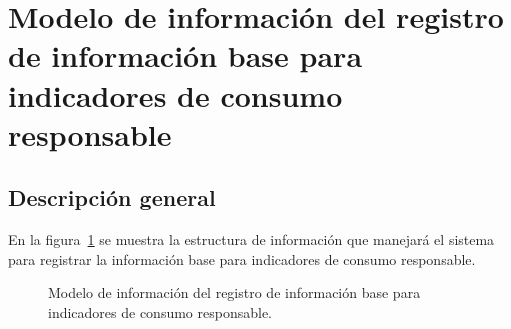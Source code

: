 \section{Modelo de información del registro de información base para indicadores de consumo responsable}

\subsection{Descripción general}
 En la figura~\ref{fig:registroInfoBaseConsumo} se muestra la estructura de información que manejará el sistema para registrar la información base para indicadores de consumo responsable.
 
\begin{figure}[htbp!]
	\begin{center}
		\caption{Modelo de información del registro de información base para indicadores de consumo responsable.}
		\label{fig:registroInfoBaseConsumo}
	\end{center}
\end{figure}


